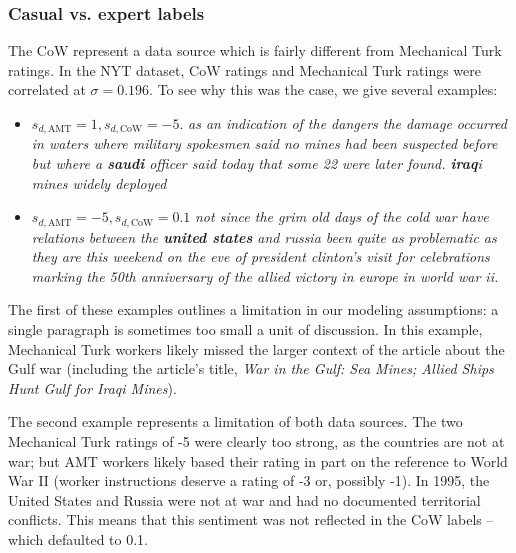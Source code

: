 \subsubsection{Casual vs. expert labels}
The CoW represent a data source which is fairly different from
Mechanical Turk ratings. In the NYT dataset, CoW ratings and
Mechanical Turk ratings were correlated at $\sigma=0.196$.  To
see why this was the case, we give several examples:
\begin{itemize}
  \item $s_{d,\mbox{AMT}} = 1, s_{d,\mbox{CoW}}=-5$. \emph{as an
    indication of the dangers the damage occurred in waters where
    military spokesmen said no mines had been suspected before but
    where a \textbf{saudi} officer said today that some 22 were later
    found. \textbf{iraq}i mines widely deployed} \cite{cushman:1991}
  \item $s_{d,\mbox{AMT}} = -5, s_{d,\mbox{CoW}}=0.1$ \emph{not since
    the grim old days of the cold war have relations between the
    \textbf{united states} and russia been quite as problematic as they
    are this weekend on the eve of president clinton's visit for
    celebrations marking the 50th anniversary of the allied victory in
    europe in world war ii.} \cite{apple:1995}
\end{itemize}

The first of these examples outlines a limitation in our modeling
assumptions: a single paragraph is sometimes too small a unit of
discussion.  In this example, Mechanical Turk workers likely missed
the larger context of the article about the Gulf war (including the
article's title, \emph{War in the Gulf: Sea Mines; Allied Ships Hunt
  Gulf for Iraqi Mines}).

The second example represents a limitation of both data sources.  The
two Mechanical Turk ratings of -5 were clearly too strong, as the
countries are not at war; but AMT workers likely based their rating in
part on the reference to World War II (worker instructions deserve a
rating of -3 or, possibly -1).  In 1995, the United States and Russia
were not at war and had no documented territorial conflicts.  This
means that this sentiment was not reflected in the CoW labels -- which
defaulted to 0.1.

\label{section:experiments}

